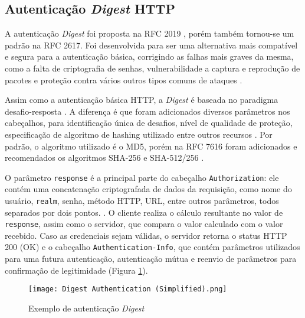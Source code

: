 \subsection{Autenticação \emph{Digest} HTTP}

A autenticação \emph{Digest} foi proposta na RFC 2019 \cite{RFC2019}, porém também tornou-se um 
padrão na RFC 2617. Foi desenvolvida para ser uma alternativa mais compatível e segura  para 
a autenticação básica, corrigindo as falhas mais graves da mesma, como a falta de criptografia de 
senhas, vulnerabilidade a captura e reprodução de pacotes e proteção contra vários outros tipos 
comuns de ataques \cite{GOURLEY2002}.

Assim como a autenticação básica HTTP, a \emph{Digest} é baseada no paradigma 
desafio-resposta \cite{RFC7616}. A diferença é que foram adicionados diversos parâmetros nos 
cabeçalhos, para identificação única de desafios, nível de qualidade de proteção, especificação de 
algoritmo de hashing utilizado entre outros recursos \cite{CHAPMAN2012}. Por padrão, o algoritmo 
utilizado é o MD5, porém na RFC 7616 foram adicionados e recomendados os algoritmos SHA-256 e 
SHA-512/256 \cite{RFC7616}.

O parâmetro \texttt{response} é a principal parte do cabeçalho \texttt{Authorization}: ele contém 
uma concatenação criptografada de dados da requisição, como nome do usuário, \texttt{realm}, senha, 
método HTTP, URL, entre outros parâmetros, todos separados por dois pontos. \cite{CHAPMAN2012}. O 
cliente realiza o cálculo resultante no valor de \texttt{response}, assim como o servidor, que 
compara o valor calculado com o valor recebido. Caso as credenciais sejam válidas, o servidor retorna
o status HTTP 200 (OK) e o cabeçalho \texttt{Authentication-Info}, que contém parâmetros utilizados 
para uma futura autenticação, autenticação mútua e reenvio de parâmetros para confirmação de 
legitimidade (Figura \ref{fig:digestAuth}).

\begin{figure}[ht]
  \centering
  \texttt{[image: Digest Authentication (Simplified).png]}
  \caption{Exemplo de autenticação \emph{Digest}}
  \label{fig:digestAuth}
\end{figure}